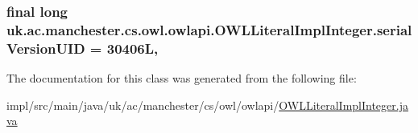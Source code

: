 \hypertarget{classuk_1_1ac_1_1manchester_1_1cs_1_1owl_1_1owlapi_1_1_o_w_l_literal_impl_integer_abc729d111ea101a213b0f0649ed57cf9}{
\subsubsection[{serial\-Version\-U\-I\-D}]{\setlength{\rightskip}{0pt plus 5cm}final long uk.\-ac.\-manchester.\-cs.\-owl.\-owlapi.\-O\-W\-L\-Literal\-Impl\-Integer.\-serial\-Version\-U\-I\-D = 30406\-L\hspace{0.3cm}{\ttfamily [static]}, {\ttfamily [private]}}}\label{classuk_1_1ac_1_1manchester_1_1cs_1_1owl_1_1owlapi_1_1_o_w_l_literal_impl_integer_abc729d111ea101a213b0f0649ed57cf9}


The documentation for this class was generated from the following file\-:\begin{DoxyCompactItemize}
\item 
impl/src/main/java/uk/ac/manchester/cs/owl/owlapi/\hyperlink{_o_w_l_literal_impl_integer_8java}{O\-W\-L\-Literal\-Impl\-Integer.\-java}\end{DoxyCompactItemize}
